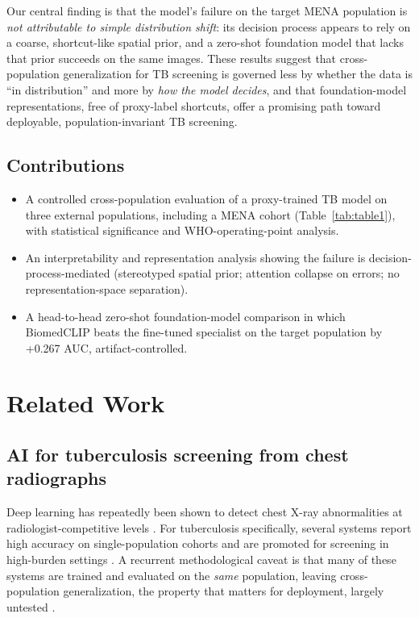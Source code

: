 \documentclass[runningheads]{llncs}
\begin{document}
Our central finding is that the model's failure on the target MENA population is \emph{not attributable to simple distribution shift}: its decision process appears to rely on a coarse, shortcut-like spatial prior, and a zero-shot foundation model that lacks that prior succeeds on the same images. These results suggest that cross-population generalization for TB screening is governed less by whether the data is ``in distribution'' and more by \emph{how the model decides}, and that foundation-model representations, free of proxy-label shortcuts, offer a promising path toward deployable, population-invariant TB screening.

\subsection*{Contributions}
\begin{itemize}
\item A controlled cross-population evaluation of a proxy-trained TB model on three external populations, including a MENA cohort (Table~\ref{tab:table1}), with statistical significance and WHO-operating-point analysis.
\item An interpretability and representation analysis showing the failure is decision-process-mediated (stereotyped spatial prior; attention collapse on errors; no representation-space separation).
\item A head-to-head zero-shot foundation-model comparison in which BiomedCLIP beats the fine-tuned specialist on the target population by +0.267 AUC, artifact-controlled.
\end{itemize}

\section{Related Work}
\subsection{AI for tuberculosis screening from chest radiographs}
Deep learning has repeatedly been shown to detect chest X-ray abnormalities at radiologist-competitive levels \cite{rajpurkar2017,irvin2019,wang2017}. For tuberculosis specifically, several systems report high accuracy on single-population cohorts and are promoted for screening in high-burden settings \cite{murphy2020}. A recurrent methodological caveat is that many of these systems are trained and evaluated on the \emph{same} population, leaving cross-population generalization, the property that matters for deployment, largely untested \cite{rajpurkar2020}.
\end{document}
